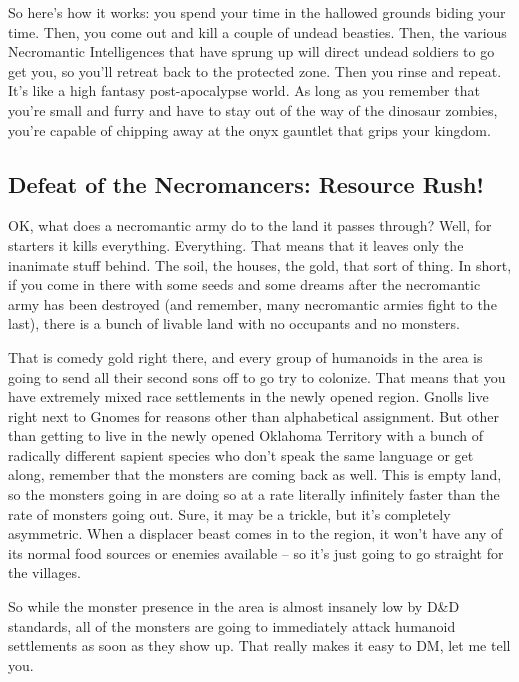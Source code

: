 So here's how it works: you spend your time in the hallowed grounds biding your time. Then, you come out and kill a couple of undead beasties. Then, the various Necromantic Intelligences that have sprung up will direct undead soldiers to go get you, so you'll retreat back to the protected zone. Then you rinse and repeat. It's like a high fantasy post-apocalypse world. As long as you remember that you're small and furry and have to stay out of the way of the dinosaur zombies, you're capable of chipping away at the onyx gauntlet that grips your kingdom.

\subsection{Defeat of the Necromancers: Resource Rush!}

OK, what does a necromantic army do to the land it passes through? Well, for starters it kills everything. Everything. That means that it leaves only the inanimate stuff behind. The soil, the houses, the gold, that sort of thing. In short, if you come in there with some seeds and some dreams after the necromantic army has been destroyed (and remember, many necromantic armies fight to the last), there is a bunch of livable land with no occupants and no monsters.

That is comedy gold right there, and every group of humanoids in the area is going to send all their second sons off to go try to colonize. That means that you have extremely mixed race settlements in the newly opened region. Gnolls live right next to Gnomes for reasons other than alphabetical assignment. But other than getting to live in the newly opened Oklahoma Territory with a bunch of radically different sapient species who don't speak the same language or get along, remember that the monsters are coming back as well. This is empty land, so the monsters going in are doing so at a rate literally infinitely faster than the rate of monsters going out. Sure, it may be a trickle, but it's completely asymmetric. When a displacer beast comes in to the region, it won't have any of its normal food sources or enemies available -- so it's just going to go straight for the villages.

So while the monster presence in the area is almost insanely low by D\&D standards, all of the monsters are going to immediately attack humanoid settlements as soon as they show up. That really makes it easy to DM, let me tell you.
